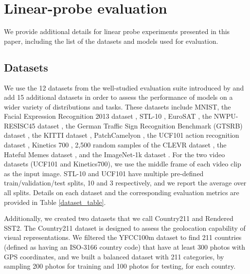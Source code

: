 \documentclass{article}
\begin{document}
\clearpage

\appendix


\section{Linear-probe evaluation}\label{sec:linear-probe}

We provide additional details for linear probe experiments presented in this paper, including the list of the datasets and models used for evaluation.

\subsection{Datasets}

We use the 12 datasets from the well-studied evaluation suite introduced by \cite{kornblith2019better} and add 15 additional datasets in order to assess the performance of models on a wider variety of distributions and tasks. These datasets include MNIST, the Facial Expression Recognition 2013 dataset \citep{goodfellow2015challenges}, STL-10 \citep{coates2011analysis}, EuroSAT \citep{helber2019eurosat}, the NWPU-RESISC45 dataset \citep{cheng2017remote}, the German Traffic Sign Recognition Benchmark (GTSRB) dataset \citep{GTSRB2011}, the KITTI dataset \citep{geiger2012kitti}, PatchCamelyon \citep{veeling2018pcam}, the UCF101 action recognition dataset \citep{soomro2012ucf101}, Kinetics 700 \citep{carreira2019kinetics700}, 2,500 random samples of the CLEVR dataset \citep{johnson2017clevr}, the Hateful Memes dataset \citep{kiela2020hateful}, and the ImageNet-1k dataset \cite{ILSVRC2012}. For the two video datasets (UCF101 and Kinetics700), we use the middle frame of each video clip as the input image. STL-10 and UCF101 have multiple pre-defined train/validation/test splits, 10 and 3 respectively, and we report the average over all splits. Details on each dataset and the corresponding evaluation metrics are provided in Table \ref{dataset_table}.

Additionally, we created two datasets that we call Country211 and Rendered SST2. The Country211 dataset is designed to assess the geolocation capability of visual representations. We filtered the YFCC100m dataset \citep{thomee2016yfcc100m} to find 211 countries (defined as having an ISO-3166 country code) that have at least 300 photos with GPS coordinates, and we built a balanced dataset with 211 categories, by sampling 200 photos for training and 100 photos for testing, for each country.
\end{document}
